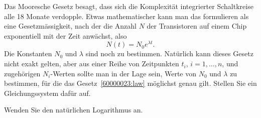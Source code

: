 Das Mooresche Gesetz besagt, dass sich die Komplexität integrierter
Schaltkreise alle 18 Monate verdopple.
Etwas mathematischer kann man das formulieren als eine Gesetzmässigkeit,
nach der die Anzahl $N$ der
Transistoren auf einem Chip exponentiell mit der Zeit anwächst, also
\begin{equation}
N(t) = N_0e^{\lambda t}.
\label{60000023:law}
\end{equation}
Die Konstanten $N_0$ und $\lambda$ sind noch zu bestimmen.
Natürlich kann dieses Gesetz nicht exakt gelten, aber aus einer
Reihe von Zeitpunkten $t_i$, $i=1,\dots,n$, und zugehörigen $N_i$-Werten sollte
man in der Lage sein, Werte von $N_0$ und $\lambda$ zu bestimmen,
für die das Gesetz~\eqref{60000023:law} möglichst genau gilt.
Stellen Sie ein Gleichungssystem dafür auf.

\begin{hinweis}
Wenden Sie den natürlichen Logarithmus an.
\end{hinweis}

